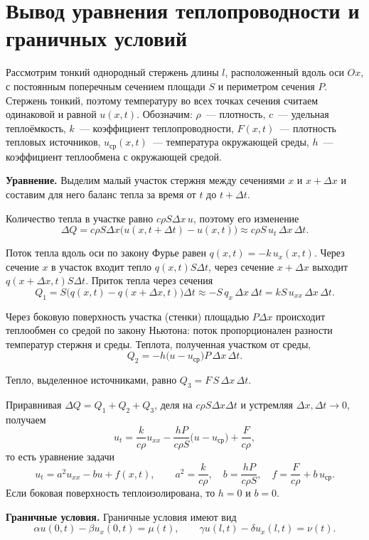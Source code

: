 \section{Вывод уравнения теплопроводности и граничных условий}\label{sec:deriv}
Рассмотрим тонкий однородный стержень длины $l$, расположенный вдоль оси $Ox$, с постоянным поперечным сечением площади $S$ и периметром сечения $P$. Стержень тонкий, поэтому температуру во всех точках сечения считаем одинаковой и равной $u(x,t)$. Обозначим: $\rho$~--- плотность, $c$~--- удельная теплоёмкость, $k$~--- коэффициент теплопроводности, $F(x,t)$~--- плотность тепловых источников, $u_{\text{ср}}(x,t)$~--- температура окружающей среды, $h$~--- коэффициент теплообмена с окружающей средой.

\textbf{Уравнение.} Выделим малый участок стержня между сечениями $x$ и $x+\Delta x$ и составим для него баланс тепла за время от $t$ до $t+\Delta t$.

Количество тепла в участке равно $c\rho S\Delta x\,u$, поэтому его изменение
\[
\Delta Q=c\rho S\Delta x\bigl(u(x,t+\Delta t)-u(x,t)\bigr)\approx c\rho S\,u_t\,\Delta x\,\Delta t .
\]

Поток тепла вдоль оси по закону Фурье равен $q(x,t)=-k\,u_x(x,t)$. Через сечение $x$ в участок входит тепло $q(x,t)S\Delta t$, через сечение $x+\Delta x$ выходит $q(x+\Delta x,t)S\Delta t$. Приток тепла через сечения
\[
Q_1=S\bigl(q(x,t)-q(x+\Delta x,t)\bigr)\Delta t\approx -S\,q_x\,\Delta x\,\Delta t=kS\,u_{xx}\,\Delta x\,\Delta t .
\]

Через боковую поверхность участка (стенки) площадью $P\Delta x$ происходит теплообмен со средой по закону Ньютона: поток пропорционален разности температур стержня и среды. Теплота, полученная участком от среды,
\[
Q_2=-h\bigl(u-u_{\text{ср}}\bigr)P\,\Delta x\,\Delta t .
\]

Тепло, выделенное источниками, равно $Q_3=F\,S\,\Delta x\,\Delta t$.

Приравнивая $\Delta Q=Q_1+Q_2+Q_3$, деля на $c\rho S\Delta x\Delta t$ и устремляя $\Delta x,\Delta t\to0$, получаем
\[
u_t=\frac{k}{c\rho}u_{xx}-\frac{hP}{c\rho S}\bigl(u-u_{\text{ср}}\bigr)+\frac{F}{c\rho},
\]
то есть уравнение задачи
\[
u_t=a^2u_{xx}-bu+f(x,t),\qquad a^2=\frac{k}{c\rho},\quad b=\frac{hP}{c\rho S},\quad f=\frac{F}{c\rho}+b\,u_{\text{ср}} .
\]
Если боковая поверхность теплоизолирована, то $h=0$ и $b=0$.

\textbf{Граничные условия.} Граничные условия имеют вид
\[
\alpha u(0,t)-\beta u_x(0,t)=\mu(t),\qquad \gamma u(l,t)-\delta u_x(l,t)=\nu(t).
\]

